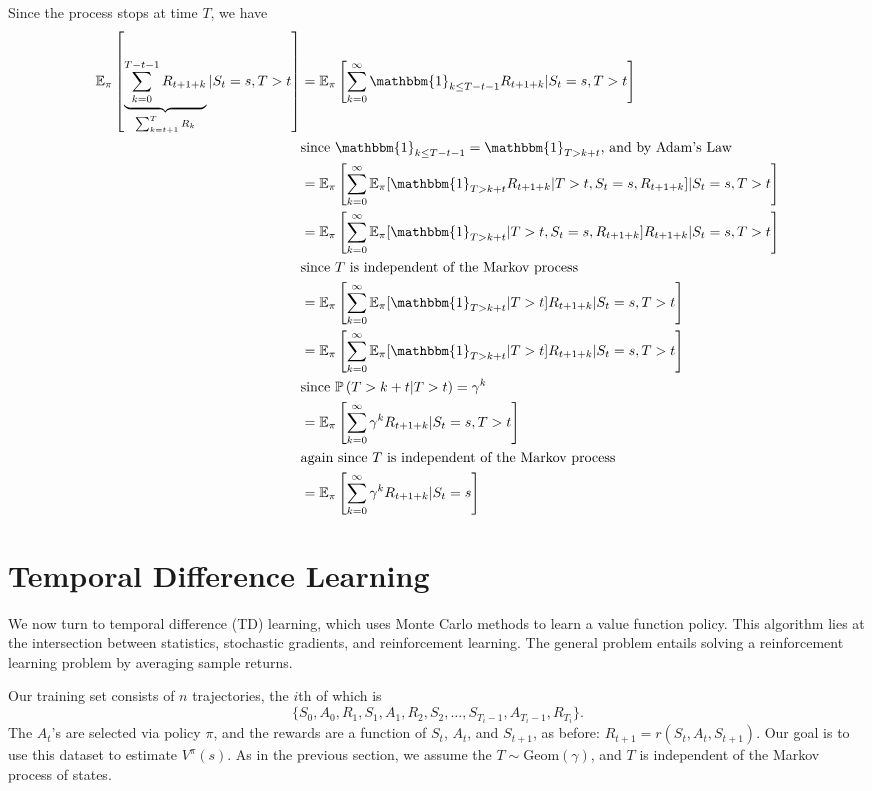 \documentclass[11pt]{article}
\begin{document}
Since the process stops at time $T$, we have
\begin{align*}
\mathbb{E}_\pi\left[\underbrace{\sum_{k = 0}^{T - t - 1} R_{t+1+k}}_{\sum_{k=t+1}^T R_k}|S_t=s,T>t\right] &= \mathbb{E}_\pi\left[\sum_{k = 0}^\infty \mathbbm{1}_{k \leq T - t - 1}R_{t+1+k}|S_t=s, T > t\right] \\
& \text{since $\mathbbm{1}_{k \leq T - t - 1} = \mathbbm{1}_{T > k+t}$, and by Adam's Law} \\
&= \mathbb{E}_\pi\left[ \sum_{k=0}^\infty \mathbb{E}_\pi[\mathbbm{1}_{T > k+t}R_{t+1+k} | T>t, S_t=s,R_{t+1+k}]|S_t=s,T>t\right] \\
&= \mathbb{E}_\pi\left[ \sum_{k=0}^\infty \mathbb{E}_\pi[\mathbbm{1}_{T > k+t} | T>t, S_t=s,R_{t+1+k}]R_{t+1+k}|S_t=s,T>t\right] \\
& \text{since $T$ is independent of the Markov process} \\
&= \mathbb{E}_\pi\left[ \sum_{k=0}^\infty \mathbb{E}_\pi[\mathbbm{1}_{T > k+t} | T>t]R_{t+1+k}|S_t=s,T>t\right] \\
&= \mathbb{E}_\pi\left[ \sum_{k=0}^\infty \mathbb{E}_\pi[\mathbbm{1}_{T > k+t} | T>t]R_{t+1+k}|S_t=s,T>t\right] \\
&\text{since $\prob{T > k+t | T > t} = \gamma^k$} \\
&=\mathbb{E}_\pi\left[\sum_{k=0}^\infty \gamma^k R_{t+1+k} | S_t = s, T > t\right] \\
&\text{again since $T$ is independent of the Markov process} \\
&=\mathbb{E}_\pi\left[\sum_{k=0}^\infty \gamma^k R_{t+1+k} | S_t = s\right] \\
\end{align*}

\section{Temporal Difference Learning}

We now turn to temporal difference (TD) learning, which uses Monte Carlo methods to learn a value function policy. This algorithm lies at the intersection between statistics, stochastic gradients, and reinforcement learning. The general problem entails solving a reinforcement learning problem by averaging sample returns. 

Our training set consists of $n$ trajectories, the $i$th of which is $$\{S_0, A_0, R_1, S_1, A_1, R_2, S_2, \dots, S_{T_i-1},A_{T_i-1},R_{T_i}\}.$$ The $A_t$'s are selected via policy $\pi$, and the rewards are a function of $S_t$, $A_t$, and $S_{t+1}$, as before: $R_{t+1}=r(S_t,A_t,S_{t+1})$. Our goal is to use this dataset to estimate $V^\pi(s)$. As in the previous section, we assume the $T \sim \text{Geom}(\gamma)$, and $T$ is independent of the Markov process of states.
\end{document}
